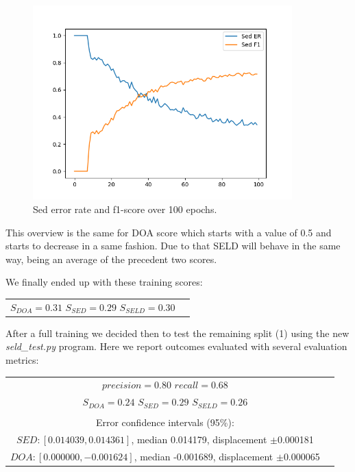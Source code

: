\documentclass[11pt]{article}
\begin{document}
\newpage
\begin{figure}[h!]
	\centering
	\includegraphics[width=10cm]{img/er_f1.png}
	\caption{Sed error rate and f1-score over 100 epochs.}
	\label{fig:erf1}
\end{figure}

\noindent
This overview is the same for DOA score which starts with a value of 0.5 and starts to decrease in a same fashion. Due to that SELD will behave in the same way, being an average of the precedent two scores.

\noindent
We finally ended up with these training scores:

\begin{center}
\begin{tabular}{cp{}}
$S_{DOA} = 0.31$ \space\space $S_{SED} = 0.29$ \space\space $S_{SELD} = 0.30$
\end{tabular}
\end{center}

\noindent
After a full training we decided then to test the remaining split (1) using the new \textit{seld\_test.py} program. Here we report outcomes evaluated with several evaluation metrics:
\begin{center}
\begin{tabular}{cp{}}
$precision = 0.80$ \space\space $recall = 0.68$\\
$S_{DOA} = 0.24$ \space\space $S_{SED} = 0.29$ \space\space $S_{SELD} = 0.26$\\
\\
Error confidence intervals (95\%):\\
$SED: [0.014039, 0.014361]$, median 0.014179, displacement $\pm$0.000181\\
$DOA: [0.000000, -0.001624]$, median -0.001689, displacement $\pm$0.000065

\end{tabular}
\end{center}
\end{document}
